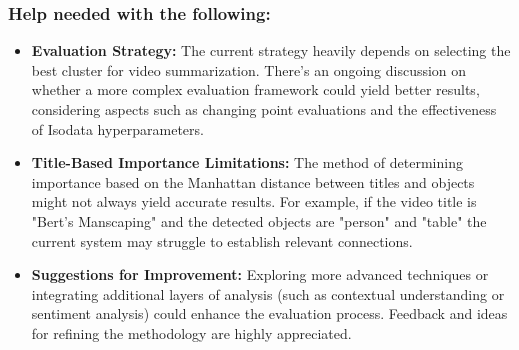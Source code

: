 \documentclass[conference]{IEEEtran}
\begin{document}
\subsubsection*{Help needed with the following:}
\begin{itemize}
\item \textbf{Evaluation Strategy:} The current strategy heavily depends on selecting the best cluster for video summarization. There's an ongoing discussion on whether a more complex evaluation framework could yield better results, considering aspects such as changing point evaluations and the effectiveness of Isodata hyperparameters.
\item \textbf{Title-Based Importance Limitations:} The method of determining importance based on the Manhattan distance between titles and objects might not always yield accurate results. For example, if the video title is "Bert's Manscaping" and the detected objects are "person" and "table" the current system may struggle to establish relevant connections.
\item \textbf{Suggestions for Improvement:} Exploring more advanced techniques or integrating additional layers of analysis (such as contextual understanding or sentiment analysis) could enhance the evaluation process. Feedback and ideas for refining the methodology are highly appreciated.
\end{itemize}
\end{document}
